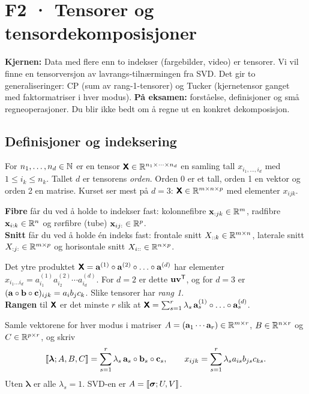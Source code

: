 \section{F2 · Tensorer og tensordekomposisjoner}

\textbf{Kjernen:} Data med flere enn to indekser (fargebilder, video) er tensorer. Vi vil finne en tensorversjon av lavrangs-tilnærmingen fra SVD. Det gir to generaliseringer: CP (sum av rang-1-tensorer) og Tucker (kjernetensor ganget med faktormatriser i hver modus).
\textbf{På eksamen:} forståelse, definisjoner og små regneoperasjoner. Du blir ikke bedt om å regne ut en konkret dekomposisjon.

\subsection{Definisjoner og indeksering}
\begin{defn}[tensor]
For $n_1,\dots,n_d\in\mathbb{N}$ er en tensor $\bm{\mathsf{X}}\in\mathbb{R}^{n_1\times\dots\times n_d}$ en samling tall $x_{i_1,\dots,i_d}$ med $1\le i_k\le n_k$. Tallet $d$ er tensorens \emph{orden}. Orden 0 er et tall, orden 1 en vektor og orden 2 en matrise. Kurset ser mest på $d=3$: $\bm{\mathsf{X}}\in\mathbb{R}^{m\times n\times p}$ med elementer $x_{ijk}$.
\end{defn}

\begin{defn}[fibre og snitt for $d=3$]
\textbf{Fibre} får du ved å holde to indekser fast: kolonnefibre $\mathbf{x}_{:jk}\in\mathbb{R}^m$, radfibre $\mathbf{x}_{i:k}\in\mathbb{R}^n$ og rørfibre (tube) $\mathbf{x}_{ij:}\in\mathbb{R}^p$.\\
\textbf{Snitt} får du ved å holde én indeks fast: frontale snitt $X_{::k}\in\mathbb{R}^{m\times n}$, laterale snitt $X_{:j:}\in\mathbb{R}^{m\times p}$ og horisontale snitt $X_{i::}\in\mathbb{R}^{n\times p}$.
\end{defn}

\begin{defn}
Det ytre produktet $\tn X=\vb a^{(1)}\outp\vb a^{(2)}\outp\dots\outp\vb a^{(d)}$ har elementer $x_{i_1\dots i_d}=a^{(1)}_{i_1}a^{(2)}_{i_2}\cdots a^{(d)}_{i_d}$. For $d=2$ er dette $\mathbf{u}\mathbf{v}^{\mathsf{T}}$, og for $d=3$ er $(\mathbf{a}\circ\mathbf{b}\circ\mathbf{c})_{ijk}=a_ib_jc_k$. Slike tensorer har \emph{rang 1}.\\
\textbf{Rangen} til $\bm{\mathsf{X}}$ er det minste $r$ slik at $\tn X=\sum_{s=1}^r\lambda_s\,\vb a^{(1)}_s\outp\dots\outp\vb a^{(d)}_s$.
\end{defn}

\begin{defn}
Samle vektorene for hver modus i matriser $A=(\mathbf{a}_1\cdots\mathbf{a}_r)\in\mathbb{R}^{m\times r}$, $B\in\mathbb{R}^{n\times r}$ og $C\in\mathbb{R}^{p\times r}$, og skriv
\[
[\![ \boldsymbol\lambda;A,B,C ]\!]=\sum_{s=1}^r\lambda_s\,\mathbf{a}_s\circ\mathbf{b}_s\circ\mathbf{c}_s,\qquad x_{ijk}=\sum_{s=1}^r\lambda_s a_{is}b_{js}c_{ks}.
\]
Uten $\boldsymbol\lambda$ er alle $\lambda_s=1$. SVD-en er $A=[\![ \boldsymbol\sigma;U,V ]\!]$.
\end{defn}

